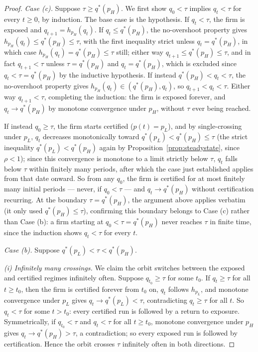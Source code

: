 \begin{proof}
\emph{Case (c).} Suppose $\tau \geq q^*(p_H)$. We first show $q_0<\tau$ implies $q_t<\tau$ for every $t\geq0$, by induction. The base case is the hypothesis. If $q_t<\tau$, the firm is exposed and $q_{t+1}=h_{p_H}(q_t)$. If $q_t\leq q^*(p_H)$, the no-overshoot property gives $h_{p_H}(q_t)\leq q^*(p_H)\leq\tau$, with the first inequality strict unless $q_t=q^*(p_H)$, in which case $h_{p_H}(q_t)=q^*(p_H)\leq\tau$ still; either way $q_{t+1}\leq q^*(p_H)\leq\tau$, and in fact $q_{t+1}<\tau$ unless $\tau=q^*(p_H)$ and $q_t=q^*(p_H)$, which is excluded since $q_t<\tau=q^*(p_H)$ by the inductive hypothesis. If instead $q^*(p_H)<q_t<\tau$, the no-overshoot property gives $h_{p_H}(q_t)\in(q^*(p_H),q_t)$, so $q_{t+1}<q_t<\tau$. Either way $q_{t+1}<\tau$, completing the induction: the firm is exposed forever, and $q_t\to q^*(p_H)$ by monotone convergence under $p_H$, without $\tau$ ever being reached.

If instead $q_0\geq\tau$, the firm starts certified ($p(t)=p_L$), and by single-crossing under $p_L$, $q_t$ decreases monotonically toward $q^*(p_L)<q^*(p_H)\leq\tau$ (the strict inequality $q^*(p_L)<q^*(p_H)$ again by Proposition~\ref{prop:steadystate}, since $\rho<1$); since this convergence is monotone to a limit strictly below $\tau$, $q_t$ falls below $\tau$ within finitely many periods, after which the case just established applies from that date onward. So from any $q_0$, the firm is certified for at most finitely many initial periods — never, if $q_0<\tau$ — and $q_t\to q^*(p_H)$ without certification recurring. At the boundary $\tau=q^*(p_H)$, the argument above applies verbatim (it only used $q^*(p_H)\leq\tau$), confirming this boundary belongs to Case (c) rather than Case (b): a firm starting at $q_0<\tau=q^*(p_H)$ never reaches $\tau$ in finite time, since the induction shows $q_t<\tau$ for every $t$.

\emph{Case (b).} Suppose $q^*(p_L) < \tau < q^*(p_H)$.

\emph{(i) Infinitely many crossings.} We claim the orbit switches between the exposed and certified regimes infinitely often. Suppose $q_{t_0}\geq\tau$ for some $t_0$. If $q_t\geq\tau$ for all $t\geq t_0$, then the firm is certified forever from $t_0$ on, $q_t$ follows $h_{p_L}$, and monotone convergence under $p_L$ gives $q_t\to q^*(p_L)<\tau$, contradicting $q_t\geq\tau$ for all $t$. So $q_t<\tau$ for some $t>t_0$: every certified run is followed by a return to exposure. Symmetrically, if $q_{t_0}<\tau$ and $q_t<\tau$ for all $t\geq t_0$, monotone convergence under $p_H$ gives $q_t\to q^*(p_H)>\tau$, a contradiction; so every exposed run is followed by certification. Hence the orbit crosses $\tau$ infinitely often in both directions.


\end{proof}
